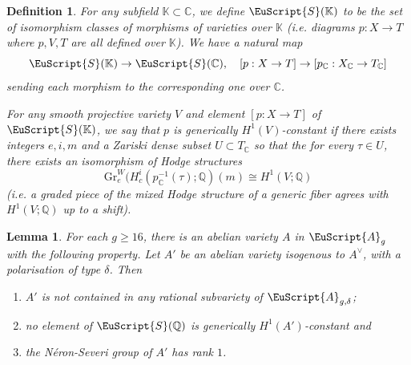 \documentclass[11pt]{amsart}
\newtheorem{defn}[thm]{Definition}
\newtheorem{lemma}[thm]{Lemma}
\newcommand{\scrA}{\EuScript{A}}
\newcommand{\scrS}{\EuScript{S}}
\newcommand{\bQ}{\mathbb{Q}}
\newcommand{\bC}{\mathbb{C}}
\newcommand{\bK}{\mathbb{K}}
\numberwithin{equation}{section}
\renewcommand{\geq}{\geqslant}
\newcommand{\Gr}{\mathrm{Gr}}
\begin{document}
\begin{defn} \label{defnweightedhomogenous}
	For any subfield $\bK \subset \bC$, we define $\scrS(\bK)$ to be the set of isomorphism classes of morphisms of varieties over $\bK$ (i.e. diagrams $p : X \to T$ where $p,V,T$ are all defined over $\bK$).
	We have a natural map
	\begin{equation} \label{eqndefiningoverbC}
		\scrS(\bK) \to \scrS(\bC), \quad [p : X \to T] \to [p_\bC : X_\bC \to T_\bC]
	\end{equation}
	sending each morphism to the corresponding one over $\bC$.

	For any smooth projective variety $V$ and element $[p : X \to T]$ of $\scrS(\bK)$, we say that $p$ is \emph{generically $H^1(V)$-constant} if there exists integers $e,i,m$ and a Zariski dense subset $U \subset T_\bC$
	so that the for every $\tau \in U$, there exists an isomorphism of Hodge structures
	\begin{equation}
		\Gr_e^W(H_c^i(p_\bC^{-1}(\tau);\bQ)(m)  \cong H^1(V;\bQ)
	\end{equation}
	(i.e. a graded piece of the mixed Hodge structure of a generic fiber agrees with $H^1(V;\bQ)$ up to a shift).
\end{defn}


\begin{lemma} \label{lemmaconditionsforA}
	For each $g \geq 16$, there is an abelian variety $A$ in $\scrA_g$ with the following property. Let $A'$ be an  abelian variety isogenous to $A^{\vee}$, with a polarisation of type $\delta$. Then
	\begin{enumerate}
		\item \label{itemNotInRational}
		      $A'$ is not contained in any rational subvariety of $\scrA_{g,\delta}$;
		\item \label{itemNoConstantSummandOfToric}
		      no element of $\scrS(\bQ)$ is generically $H^1(A')$-constant and
		\item \label{itemNScondition} the N\'eron-Severi  group of $A'$ has rank $1$.
	\end{enumerate}
\end{lemma}
\end{document}
